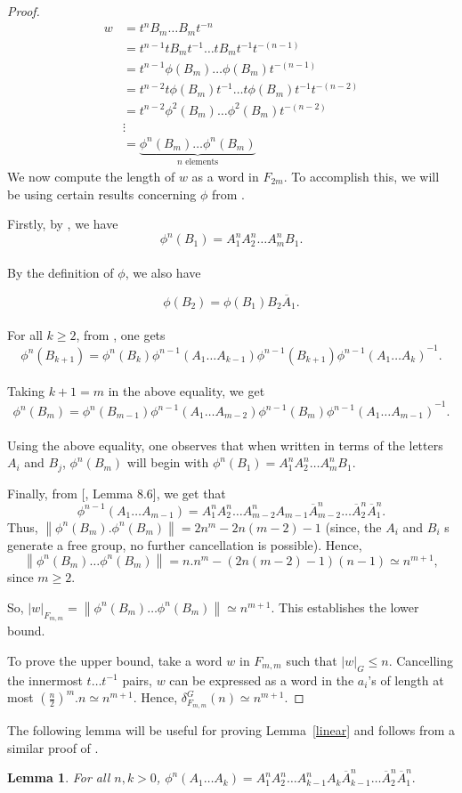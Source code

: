 \documentclass[oneside,11pt,reqno]{amsart}
\newtheorem{lem}[thm]{Lemma}
\theoremstyle{definition}
\newcommand{\norm}[1]{\left\lVert{#1}\right\rVert}
\begin{document}
\begin{proof}
\begin{align*}
w &=t^n B_m \ldots B_m t^{-n}\\
&=t^{n-1}tB_mt^{-1} \ldots tB_mt^{-1}t^{-(n-1)}\\
&=t^{n-1}\phi(B_m) \ldots \phi(B_m)t^{-(n-1)}\\
&=t^{n-2}t\phi(B_m)t^{-1} \ldots t\phi(B_m)t^{-1} t^{-(n-2)}\\
&=t^{n-2}\phi^2(B_m) \ldots \phi^2(B_m)t^{-(n-2)}\\
& \vdots\\
&=\underbrace{
    \phi^n(B_m)  \ldots \phi^n(B_m)
    }_{\text{$n$~elements}}
\end{align*}
We now compute the length of $w$ as a word in $F_{2m}$. To accomplish this, we will be using certain results concerning $\phi$ from \cite{BS}. 

Firstly, by \cite[Lemma 8.4]{BS}, we have $$\phi^n(B_1)=A_1^nA_2^n \ldots A_m^nB_1.$$ 
\\
By the definition of $\phi$, we also have 

$$\phi(B_2)=\phi(B_1)B_2 \overline{A}_1.$$\\
For all $k \geq 2$, from \cite[Claim 8.8]{BS}, one gets $$\phi^n(B_{k+1})=\phi^n(B_k)\phi^{n-1}(A_1 \ldots A_{k-1})\phi^{n-1}(B_{k+1}){\phi^{n-1}(A_1 \ldots A_k)}^{-1}.$$
\\
Taking $k+1=m$ in the above equality, we get $$\phi^n(B_{m})=\phi^n(B_{m-1})\phi^{n-1}(A_1 \ldots A_{m-2})\phi^{n-1}(B_{m}){\phi^{n-1}(A_1 \ldots A_{m-1})}^{-1}.$$
\\
Using the above equality, one observes that when written in terms of the letters $A_i$ and $B_j$, $\phi^n(B_m)$ will begin with $\phi^n(B_1)=A_1^nA_2^n \ldots A_m^nB_1$.

Finally, from [\cite{BS}, Lemma 8.6], we get that $${\phi^{n-1}(A_1 \ldots A_{m-1})} = A_1^{n}A_2^n \ldots A_{m-2}^nA_{m-1} \overline{A}^n_{m-2} \ldots \overline{A}^n_2 \overline{A}^n_1.$$
Thus, $\norm{\phi^n(B_m).\phi^n(B_m)} = 2n^m - 2n(m-2)-1$ (since, the $A_i$ and $B_i$ s generate a free group, no further cancellation is possible). Hence, $$\norm{\phi^n(B_m) \ldots \phi^n(B_m)} = n.n^{m} - (2n(m-2)-1)(n-1) \simeq n^{m+1},$$ since $m \geq 2$.

So, $|w|_{F_{m,m}} = \norm{\phi^n(B_m) \ldots \phi^n(B_m)} \simeq n^{m+1}$. This establishes the lower bound.

To prove the upper bound, take a word $w$ in $F_{m,m}$ such that $|w|_G \leq n$. Cancelling the innermost $t \ldots t^{-1}$ pairs, $w$ can be expressed as a word in the $a_i$'s of length at most $(\frac{n}{2})^m.n \simeq n^{m+1}$. Hence, $\delta_{F_{m,m}}^G (n) \simeq n^{m+1}$.



\end{proof}
The following lemma will be useful for proving Lemma~\ref{linear} and follows from a similar proof of \cite[Lemma 8.6]{BS}.
\begin{lem}\label{productA} For all $n , k > 0$,
${\phi^{n}(A_1 \ldots A_{k})} = A_1^{n}A_2^n \ldots A_{k-1}^nA_{k} \overline{A}^n_{k-1} \ldots \overline{A}^n_2 \overline{A}^n_1.$
\end{lem}
\end{document}
